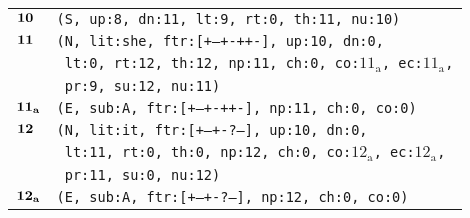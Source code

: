 \documentclass{article}
\begin{document}
\begin{minipage}{\textwidth}
{\begin{tabular}{|r|l|}
    ${\textbf{\textrm{10}}_{\phantom{z}}}$ & \texttt{\texttt{(S,~up:8,~dn:11,~lt:9,~rt:0,~th:11,~nu:10)}} \\
    ${\textbf{\textrm{11}}_{\phantom{z}}}$ & \texttt{\texttt{(N,~lit:she,~ftr:[+--+-++-],~up:10,~dn:0,}} \\
    & \texttt{\texttt{~lt:0,~rt:12,~th:12,~np:11,~ch:0,~co:${\textrm{11}_{\textrm{a}}}$,~ec:${\textrm{11}_{\textrm{a}}}$,}} \\
    & \texttt{\texttt{~pr:9,~su:12,~nu:11)}} \\
    ${\textbf{\textrm{11}}_{\textbf{\textrm{a}}}}$ & \texttt{\texttt{(E,~sub:A,~ftr:[+--+-++-],~np:11,~ch:0,~co:0)}} \\
    ${\textbf{\textrm{12}}_{\phantom{z}}}$ & \texttt{\texttt{(N,~lit:it,~ftr:[+--+-?--],~up:10,~dn:0,}} \\
    & \texttt{\texttt{~lt:11,~rt:0,~th:0,~np:12,~ch:0,~co:${\textrm{12}_{\textrm{a}}}$,~ec:${\textrm{12}_{\textrm{a}}}$,}} \\
    & \texttt{\texttt{~pr:11,~su:0,~nu:12)}} \\
    ${\textbf{\textrm{12}}_{\textbf{\textrm{a}}}}$ & \texttt{\texttt{(E,~sub:A,~ftr:[+--+-?--],~np:12,~ch:0,~co:0)}} \\
    \hline
  \end{tabular}
  }
\end{minipage}
\bigbreak

\bigbreak
\vbox{}
\bigbreak
\end{document}
